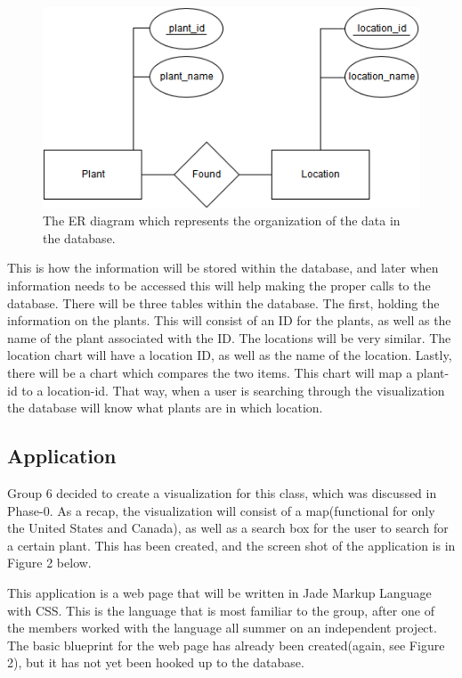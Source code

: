 \documentclass{Group6_Phase1}
\begin{document}
\begin{figure}[htb]
	\centering
	\includegraphics[scale=0.5]{FinalProject_ERdiagram.png}
	\caption{The ER diagram which represents the organization of the data in the database.}
\end{figure}

This is how the information will be stored within the database, and later when information needs to be accessed this will help making the proper calls to the database. There will be three tables within the database. The first, holding the information on the plants. This will consist of an ID for the plants, as well as the name of the plant associated with the ID. The locations will be very similar. The location chart will have a location ID, as well as the name of the location. Lastly, there will be a chart which compares the two items. This chart will map a plant-id to a location-id. That way, when a user is searching through the visualization the database will know what plants are in which location. 


\subsection{Application}
Group 6 decided to create a visualization for this class, which was discussed in Phase-0. As a recap, the visualization will consist of a map(functional for only the United States and Canada), as well as a search box for the user to search for a certain plant. This has been created, and the screen shot of the application is in Figure 2 below. 

This application is a web page that will be written in Jade Markup Language with CSS. This is the language that is most familiar to the group, after one of the members worked with the language all summer on an independent project. The basic blueprint for the web page has already been created(again, see Figure 2), but it has not yet been hooked up to the database. 
\end{document}
